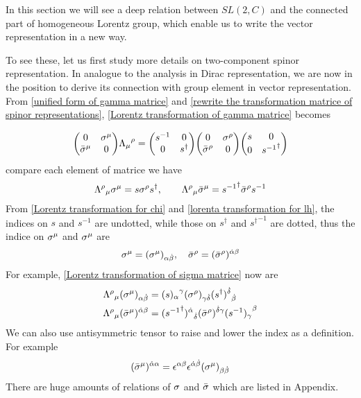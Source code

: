 In this section we will see a deep relation between $SL(2,C)$ and the connected part of homogeneous Lorentz group, which enable us to write the vector representation in a new way.

To see these, let us first study more details on two-component spinor representation. In analogue to the analysis in Dirac representation, we are now in the position to derive its connection with group element in vector representation. From \eqref{unified form of gamma matrice} and \eqref{rewrite the transformation matrice of spinor representations}, \eqref{Lorentz transformation of gamma matrice} becomes

\begin{equation}
\mqty( 0 & \s^{\m} \\ \bar{\s}^{\m} & 0)
{\Lambda_{\m}}^{\rh}
= \mqty(s^{-1} & 0 \\ 0 & s^{\dagger} )
\mqty( 0 & \s^{\rh} \\ \bar{\s}^{\rh} & 0)
 \mqty(s & 0 \\ 0 & {s^{-1}}^{\dagger} )
\end{equation}
compare each element of matrice we have
\begin{equation} \label{Lorentz transformation of sigma matrice}
{\Lambda^{\rho}}_{\mu} \sigma^{\mu} =  s\sigma^{\rho} {s}^{\dagger}
,\qquad
{\Lambda^{\rho}}_{\mu} \bar{\sigma}^{\mu} =  {s^{-1}}^{\dagger}\bar{\sigma}^{\rho} s^{-1}
\end{equation}
From \eqref{Lorentz transformation for chi} and \eqref{lorenta transformation for lh}, the indices on $s$ and $s^{-1}$ are undotted, while those on $s^{\dagger}$ and ${s^{\dagger}}^{-1}$ are dotted, thus the indice on $\sigma^{\mu}$ and $\sigma^{\mu}$ are
\begin{equation}
  \sigma^{\mu} = (\sigma^{\mu})_{\alpha\dot{\beta}},\quad
\bar{\sigma}^{\rho} = (\bar{\sigma}^{\rho})^{\dot{\alpha}\beta}
\end{equation}
For example, \eqref{Lorentz transformation of sigma matrice} now are
\begin{align}
{\Lambda^{\rho}}_{\mu} (\sigma^{\mu})_{\alpha\dot{\beta}} &=
({s)_{\alpha}}^{\gamma}
(\sigma^{\rho})_{\gamma\dot{\delta}}
{({s}^{\dagger})^{\dot{\delta}}}_{\dot{\beta}}\\
{\Lambda^{\rho}}_{\mu} (\bar{\sigma}^{\mu})^{\dot{\alpha}\beta}
&=
{({s^{-1}}^{\dagger})^{\dot{\alpha}}}_{\dot{\delta}}
(\bar{\sigma}^{\rho})^{\dot{\delta}\gamma}
{(s^{-1})_{\gamma}}^{\beta}
\end{align}
We can also use antisymmetric tensor to raise and lower the index as a definition. For example
\begin{equation}
  (\bar{\sigma}^{\mu})^{\dot{\alpha}\alpha} = \epsilon^{\alpha\beta}\epsilon^{\dot{\alpha}\dot{\beta}}(\sigma^{\mu})_{\beta\dot{\beta}}
\end{equation}
There are huge amounts of relations of $\sigma$ and $\bar{\sigma}$ which are listed in Appendix.

